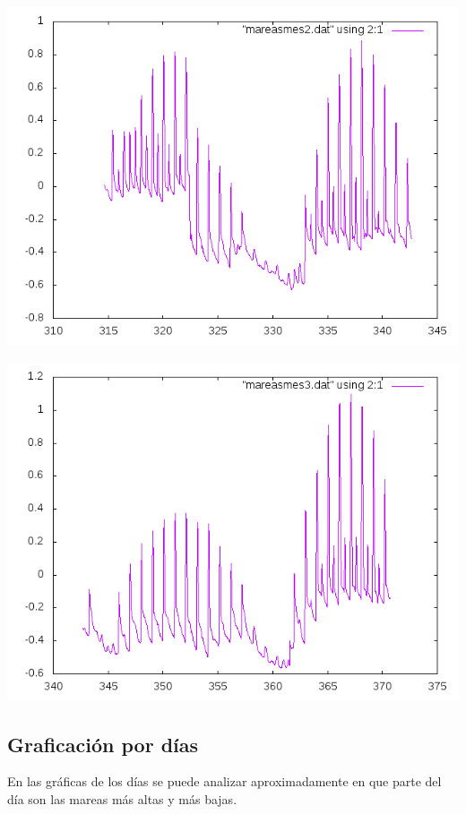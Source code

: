 \documentclass[10pt]{article}
\begin{document}
\begin{center}
   \includegraphics[scale=0.8]{month2.png}
\end{center}

\begin{center}
   \includegraphics[scale=0.8]{month3.png}
\end{center}
\newpage
\subsection{Graficación por días}
En las gráficas de los días se puede analizar aproximadamente en que parte del día son las mareas más altas y más bajas.
\end{document}
